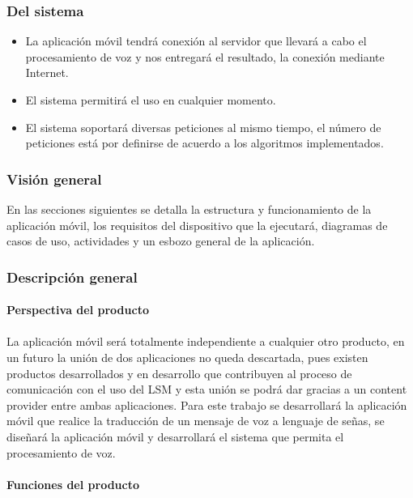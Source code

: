 \subsubsection{Del sistema}

\begin{itemize}
\item	La aplicación móvil tendrá conexión al servidor que llevará a cabo el procesamiento de voz y nos entregará el resultado, la conexión mediante Internet.
\item	El sistema permitirá el uso en cualquier momento.
\item	El sistema soportará diversas peticiones al mismo tiempo, el número de peticiones está por definirse de acuerdo a los algoritmos implementados.
\end{itemize}

\subsubsection{Visión general}

En las secciones siguientes se detalla la estructura y funcionamiento de la aplicación móvil, los requisitos del dispositivo que la ejecutará, diagramas de casos de uso, actividades y un esbozo general de la aplicación.

\subsubsection{Descripción general}
\paragraph{Perspectiva del producto}\paragraph{}

La aplicación móvil será totalmente independiente a cualquier otro producto, en un futuro la unión de dos aplicaciones no queda descartada, pues existen productos desarrollados y en desarrollo que contribuyen al proceso de comunicación con el uso del LSM y esta unión se podrá dar gracias a un content provider entre ambas aplicaciones. Para este trabajo se desarrollará la aplicación móvil que realice la traducción de un mensaje de voz a lenguaje de señas, se diseñará la aplicación móvil y desarrollará el sistema que permita el procesamiento de voz.

\paragraph{Funciones del producto}\paragraph{}

